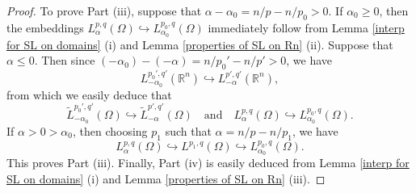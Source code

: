 \documentclass[10pt,a4paper]{amsart}
\newcommand{\R}{{\mathbb{R}}}
\begin{document}
\begin{proof}
To prove Part (iii), suppose  that $\alpha-\alpha_0 = n/p-n/p_0 >0$. If $\alpha_0 \ge 0$, then the embeddings   $ L_\alpha^{p,q}(\Omega )  \hookrightarrow    L_{\alpha_0}^{p_0,q }(\Omega )
$  immediately follow   from Lemma \ref{interp for SL on domains} (i) and Lemma \ref{properties of SL on Rn} (ii). Suppose   that $\alpha \le 0$. Then since $(-\alpha_0) -( -\alpha) = n/p_0' - n/p' > 0$, we have
 $$
L_{-\alpha_0}^{p_0',q'}(\R^n )  \hookrightarrow    L_{-\alpha}^{p',q'}(\R^n ) ,
$$
from which we easily deduce  that
\[
\widetilde{L}_{-\alpha_0}^{p_0',q'}(\Omega )  \hookrightarrow  \widetilde{L}_{-\alpha}^{p',q  '}(\Omega )
\quad\text{and}\quad
L_\alpha^{p,q}(\Omega )
 \hookrightarrow L_{\alpha_0}^{p_0,q }(\Omega )   .
\]
If $\alpha>0 > \alpha_0$, then choosing $p_1$ such that $\alpha=n/p-n/p_1$,  we have
$$
L_\alpha^{p,q}(\Omega )
 \hookrightarrow L^{p_1,q }(\Omega )
 \hookrightarrow L_{\alpha_0}^{p_0,q }(\Omega ) .
$$
This proves Part (iii).
Finally, Part (iv) is easily deduced from  Lemma \ref{interp for SL on domains} (i)  and Lemma \ref{properties of SL on Rn} (iii).
\end{proof}
\end{document}
